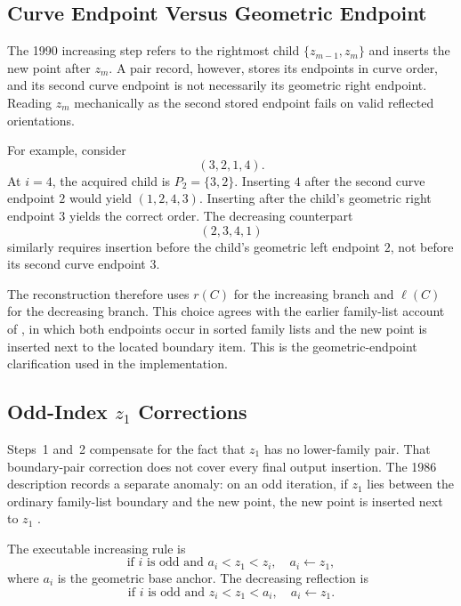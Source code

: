 \subsection{Curve Endpoint Versus Geometric Endpoint}
\label{sec:algorithm-geometric-anchor}

The 1990 increasing step refers to the rightmost child
$\{z_{m-1},z_m\}$ and inserts the new point after $z_m$. A pair record,
however, stores its endpoints in curve order, and its second curve endpoint is
not necessarily its geometric right endpoint. Reading $z_m$ mechanically as
the second stored endpoint fails on valid reflected orientations.

For example, consider
\begin{equation}
  (3,2,1,4).
\end{equation}
At $i=4$, the acquired child is $P_2=\{3,2\}$. Inserting $4$ after the second
curve endpoint $2$ would yield $(1,2,4,3)$. Inserting after the child's
geometric right endpoint $3$ yields the correct order. The decreasing
counterpart
\begin{equation}
  (2,3,4,1)
\end{equation}
similarly requires insertion before the child's geometric left endpoint $2$,
not before its second curve endpoint $3$.

The reconstruction therefore uses $r(C)$ for the increasing branch and
$\ell(C)$ for the decreasing branch. This choice agrees with the earlier
family-list account of \textcite{hoffmann1986sorting}, in which both endpoints
occur in sorted family lists and the new point is inserted next to the located
boundary item. This is the geometric-endpoint clarification used in the
implementation.

\subsection{Odd-Index \texorpdfstring{$z_1$}{z1} Corrections}
\label{sec:algorithm-z1-anchor}

Steps~1 and~2 compensate for the fact that $z_1$ has no lower-family pair.
That boundary-pair correction does not cover every final output insertion.
The 1986 description records a separate anomaly: on an odd iteration, if
$z_1$ lies between the ordinary family-list boundary and the new point, the
new point is inserted next to $z_1$
\parencite[p.~175]{hoffmann1986sorting}.

The executable increasing rule is
\begin{equation}
  \text{if $i$ is odd and } a_i<z_1<z_i,
  \quad a_i\gets z_1,
  \label{eq:algorithm-z1-increasing}
\end{equation}
where $a_i$ is the geometric base anchor. The decreasing reflection is
\begin{equation}
  \text{if $i$ is odd and } z_i<z_1<a_i,
  \quad a_i\gets z_1.
  \label{eq:algorithm-z1-decreasing}
\end{equation}


